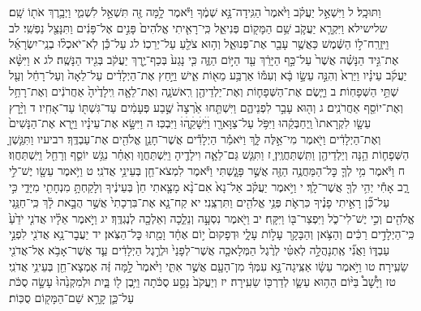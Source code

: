 \documentclass[twoside, openany, parskip=half, 11pt]{book}
\begin{document}
וַתּוּכָֽל׃ ל וַיִּשְׁאַ֣ל יַעֲקֹ֗ב וַיֹּ֙אמֶר֙ הַגִּֽידָה־נָּ֣א שְׁמֶ֔ךָ וַיֹּ֕אמֶר לָ֥מָּה זֶּ֖ה תִּשְׁאַ֣ל לִשְׁמִ֑י וַיְבָ֥רֶךְ אֹת֖וֹ שָֽׁם׃ שלישילא וַיִּקְרָ֧א יַעֲקֹ֛ב שֵׁ֥ם הַמָּק֖וֹם פְּנִיאֵ֑ל כִּֽי־רָאִ֤יתִי אֱלֹהִים֙ פָּנִ֣ים אֶל־פָּנִ֔ים וַתִּנָּצֵ֖ל נַפְשִֽׁי׃ לב וַיִּֽזְרַֽח־ל֣וֹ הַשֶּׁ֔מֶשׁ כַּאֲשֶׁ֥ר עָבַ֖ר אֶת־פְּנוּאֵ֑ל וְה֥וּא צֹלֵ֖עַ עַל־יְרֵכֽוֹ׃ לג עַל־כֵּ֡ן לֹֽא־יֹאכְל֨וּ בְנֵֽי־יִשְׂרָאֵ֜ל אֶת־גִּ֣יד הַנָּשֶׁ֗ה אֲשֶׁר֙ עַל־כַּ֣ף הַיָּרֵ֔ךְ עַ֖ד הַיּ֣וֹם הַזֶּ֑ה כִּ֤י נָגַע֙ בְּכַף־יֶ֣רֶךְ יַעֲקֹ֔ב בְּגִ֖יד הַנָּשֶֽׁה׃ לג א וַיִּשָּׂ֨א יַעֲקֹ֜ב עֵינָ֗יו וַיַּרְא֙ וְהִנֵּ֣ה עֵשָׂ֣ו בָּ֔א וְעִמּ֕וֹ אַרְבַּ֥ע מֵא֖וֹת אִ֑ישׁ וַיַּ֣חַץ אֶת־הַיְלָדִ֗ים עַל־לֵאָה֙ וְעַל־רָחֵ֔ל וְעַ֖ל שְׁתֵּ֥י הַשְּׁפָחֽוֹת׃ ב וַיָּ֧שֶׂם אֶת־הַשְּׁפָח֛וֹת וְאֶת־יַלְדֵיהֶ֖ן רִֽאשֹׁנָ֑ה וְאֶת־לֵאָ֤ה וִֽילָדֶ֙יהָ֙ אַחֲרֹנִ֔ים וְאֶת־רָחֵ֥ל וְאֶת־יוֹסֵ֖ף אַחֲרֹנִֽים׃ ג וְה֖וּא עָבַ֣ר לִפְנֵיהֶ֑ם וַיִּשְׁתַּ֤חוּ אַ֙רְצָה֙ שֶׁ֣בַע פְּעָמִ֔ים עַד־גִּשְׁתּ֖וֹ עַד־אָחִֽיו׃ ד וַיָּ֨רׇץ עֵשָׂ֤ו לִקְרָאתוֹ֙ וַֽיְחַבְּקֵ֔הוּ וַיִּפֹּ֥ל עַל־צַוָּארָ֖ו וַׄיִּׄשָּׁׄקֵ֑ׄהׄוּׄ וַיִּבְכּֽוּ׃ ה וַיִּשָּׂ֣א אֶת־עֵינָ֗יו וַיַּ֤רְא אֶת־הַנָּשִׁים֙ וְאֶת־הַיְלָדִ֔ים וַיֹּ֖אמֶר מִי־אֵ֣לֶּה לָּ֑ךְ וַיֹּאמַ֕ר הַיְלָדִ֕ים אֲשֶׁר־חָנַ֥ן אֱלֹהִ֖ים אֶת־עַבְדֶּֽךָ׃ רביעיו וַתִּגַּ֧שְׁןָ הַשְּׁפָח֛וֹת הֵ֥נָּה וְיַלְדֵיהֶ֖ן וַתִּֽשְׁתַּחֲוֶֽיןָ׃ ז וַתִּגַּ֧שׁ גַּם־לֵאָ֛ה וִילָדֶ֖יהָ וַיִּֽשְׁתַּחֲו֑וּ וְאַחַ֗ר נִגַּ֥שׁ יוֹסֵ֛ף וְרָחֵ֖ל וַיִּֽשְׁתַּחֲוֽוּ׃ ח וַיֹּ֕אמֶר מִ֥י לְךָ֛ כׇּל־הַמַּחֲנֶ֥ה הַזֶּ֖ה אֲשֶׁ֣ר פָּגָ֑שְׁתִּי וַיֹּ֕אמֶר לִמְצֹא־חֵ֖ן בְּעֵינֵ֥י אֲדֹנִֽי׃ ט וַיֹּ֥אמֶר עֵשָׂ֖ו יֶשׁ־לִ֣י רָ֑ב אָחִ֕י יְהִ֥י לְךָ֖ אֲשֶׁר־לָֽךְ׃ י וַיֹּ֣אמֶר יַעֲקֹ֗ב אַל־נָא֙ אִם־נָ֨א מָצָ֤אתִי חֵן֙ בְּעֵינֶ֔יךָ וְלָקַחְתָּ֥ מִנְחָתִ֖י מִיָּדִ֑י כִּ֣י עַל־כֵּ֞ן רָאִ֣יתִי פָנֶ֗יךָ כִּרְאֹ֛ת פְּנֵ֥י אֱלֹהִ֖ים וַתִּרְצֵֽנִי׃ יא קַח־נָ֤א אֶת־בִּרְכָתִי֙ אֲשֶׁ֣ר הֻבָ֣את לָ֔ךְ כִּֽי־חַנַּ֥נִי אֱלֹהִ֖ים וְכִ֣י יֶשׁ־לִי־כֹ֑ל וַיִּפְצַר־בּ֖וֹ וַיִּקָּֽח׃ יב וַיֹּ֖אמֶר נִסְעָ֣ה וְנֵלֵ֑כָה וְאֵלְכָ֖ה לְנֶגְדֶּֽךָ׃ יג וַיֹּ֣אמֶר אֵלָ֗יו אֲדֹנִ֤י יֹדֵ֙עַ֙ כִּֽי־הַיְלָדִ֣ים רַכִּ֔ים וְהַצֹּ֥אן וְהַבָּקָ֖ר עָל֣וֹת עָלָ֑י וּדְפָקוּם֙ י֣וֹם אֶחָ֔ד וָמֵ֖תוּ כׇּל־הַצֹּֽאן׃ יד יַעֲבׇר־נָ֥א אֲדֹנִ֖י לִפְנֵ֣י עַבְדּ֑וֹ וַאֲנִ֞י אֶֽתְנָהֲלָ֣ה לְאִטִּ֗י לְרֶ֨גֶל הַמְּלָאכָ֤ה אֲשֶׁר־לְפָנַי֙ וּלְרֶ֣גֶל הַיְלָדִ֔ים עַ֛ד אֲשֶׁר־אָבֹ֥א אֶל־אֲדֹנִ֖י שֵׂעִֽירָה׃ טו וַיֹּ֣אמֶר עֵשָׂ֔ו אַצִּֽיגָה־נָּ֣א עִמְּךָ֔ מִן־הָעָ֖ם אֲשֶׁ֣ר אִתִּ֑י וַיֹּ֙אמֶר֙ לָ֣מָּה זֶּ֔ה אֶמְצָא־חֵ֖ן בְּעֵינֵ֥י אֲדֹנִֽי׃ טז וַיָּ֩שׇׁב֩ בַּיּ֨וֹם הַה֥וּא עֵשָׂ֛ו לְדַרְכּ֖וֹ שֵׂעִֽירָה׃ יז וְיַעֲקֹב֙ נָסַ֣ע סֻכֹּ֔תָה וַיִּ֥בֶן ל֖וֹ בָּ֑יִת וּלְמִקְנֵ֙הוּ֙ עָשָׂ֣ה סֻכֹּ֔ת עַל־כֵּ֛ן קָרָ֥א שֵׁם־הַמָּק֖וֹם סֻכּֽוֹת׃
\end{document}

